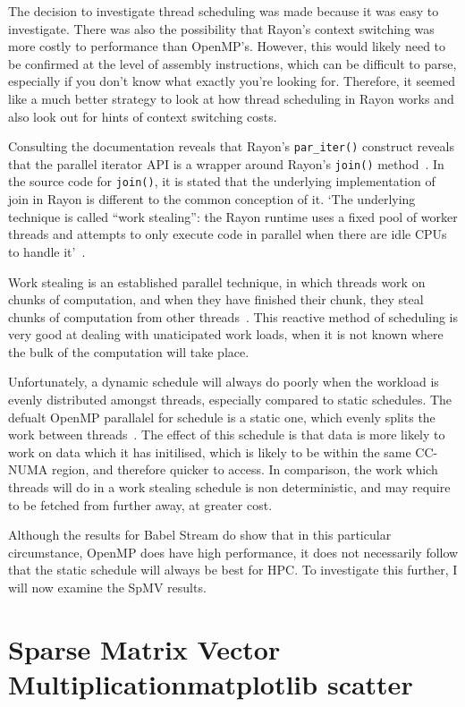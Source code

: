 The decision to investigate thread scheduling was made because it was easy to investigate. There was also the possibility that Rayon's context switching was more costly to performance than OpenMP's. However, this would likely need to be confirmed at the level of assembly instructions, which can be difficult to parse, especially if you don't know what exactly you're looking for. Therefore, it seemed like a much better strategy to look at how thread scheduling in Rayon works  and also look out for hints of context switching costs.

Consulting the documentation reveals that Rayon's \texttt{par\_iter()} construct reveals that the parallel iterator API is a wrapper around Rayon's \texttt{join()} method~\cite{smallCult}. In the source code for \texttt{join()}, it is stated that the underlying implementation of join in Rayon is different to the common conception of it. 
`The underlying technique is called ``work stealing'': the
Rayon runtime uses a fixed pool of worker threads and attempts to only execute code in parallel when there are idle CPUs to handle it'~\cite{joinSrc}.

Work stealing is an established parallel technique, in which threads work on chunks of computation, and when they have finished their chunk, they steal chunks of computation from other threads~\cite{blumofe1999}. This reactive method of scheduling is very good at dealing with unaticipated work loads, when it is not known where the bulk of the computation will take place.

Unfortunately, a dynamic schedule will always do poorly when the workload is evenly distributed amongst threads, especially compared to static schedules. The defualt OpenMP parallalel for schedule is a static one, which evenly splits the work between threads~\cite{OpenMPSpec5}. The effect of this schedule is that data is more likely to work on data which it has initilised, which is likely to be within the same CC-NUMA region, and therefore quicker to access. In comparison, the work which threads will do in a work stealing schedule is non deterministic, and may require to be fetched from further away, at greater cost.

Although the results for Babel Stream do show that in this particular circumstance, OpenMP does have high performance, it does not necessarily follow that the static schedule will always be best for HPC. To investigate this further, I will now examine the SpMV results.
\section{Sparse Matrix Vector Multiplicationmatplotlib scatter }\label{sec:res-sparse}
